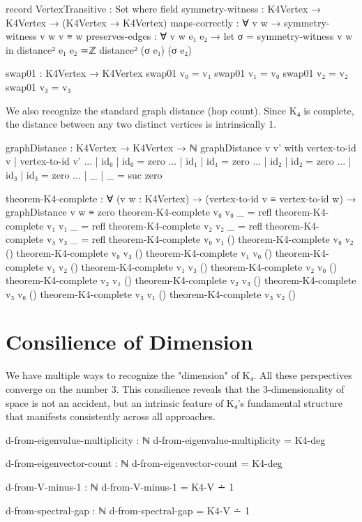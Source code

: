 \documentclass[11pt,a4paper]{book}
\begin{document}
\begin{code}
record VertexTransitive : Set where
  field
    symmetry-witness : K4Vertex → K4Vertex → (K4Vertex → K4Vertex)
    maps-correctly : ∀ v w → symmetry-witness v w v ≡ w
    preserves-edges : ∀ v w e₁ e₂ → 
      let σ = symmetry-witness v w in
      distance² e₁ e₂ ≃ℤ distance² (σ e₁) (σ e₂)

swap01 : K4Vertex → K4Vertex
swap01 v₀ = v₁
swap01 v₁ = v₀
swap01 v₂ = v₂
swap01 v₃ = v₃

\end{code}

We also recognize the standard graph distance (hop count). Since K₄ is complete, the distance between any two distinct vertices is intrinsically 1.

\begin{code}
graphDistance : K4Vertex → K4Vertex → ℕ
graphDistance v v' with vertex-to-id v | vertex-to-id v'
... | id₀ | id₀ = zero
... | id₁ | id₁ = zero
... | id₂ | id₂ = zero
... | id₃ | id₃ = zero
... | _   | _   = suc zero

theorem-K4-complete : ∀ (v w : K4Vertex) → 
  (vertex-to-id v ≡ vertex-to-id w) → graphDistance v w ≡ zero
theorem-K4-complete v₀ v₀ _ = refl
theorem-K4-complete v₁ v₁ _ = refl
theorem-K4-complete v₂ v₂ _ = refl
theorem-K4-complete v₃ v₃ _ = refl
theorem-K4-complete v₀ v₁ ()
theorem-K4-complete v₀ v₂ ()
theorem-K4-complete v₀ v₃ ()
theorem-K4-complete v₁ v₀ ()
theorem-K4-complete v₁ v₂ ()
theorem-K4-complete v₁ v₃ ()
theorem-K4-complete v₂ v₀ ()
theorem-K4-complete v₂ v₁ ()
theorem-K4-complete v₂ v₃ ()
theorem-K4-complete v₃ v₀ ()
theorem-K4-complete v₃ v₁ ()
theorem-K4-complete v₃ v₂ ()
\end{code}

\section{Consilience of Dimension}

We have multiple ways to recognize the "dimension" of K₄. All these perspectives converge on the number 3. This consilience reveals that the 3-dimensionality of space is not an accident, but an intrinsic feature of K₄'s fundamental structure that manifests consistently across all approaches.

\begin{code}
d-from-eigenvalue-multiplicity : ℕ
d-from-eigenvalue-multiplicity = K4-deg

d-from-eigenvector-count : ℕ
d-from-eigenvector-count = K4-deg

d-from-V-minus-1 : ℕ
d-from-V-minus-1 = K4-V ∸ 1

d-from-spectral-gap : ℕ
d-from-spectral-gap = K4-V ∸ 1
\end{code}
\end{document}
